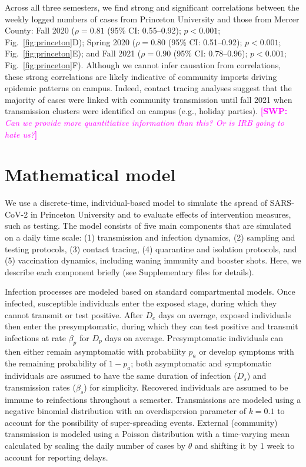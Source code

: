 \documentclass[12pt]{article}
\newcommand{\fref}[1]{Fig.~\ref{fig:#1}}
\newcommand{\comment}[3]{\textcolor{#1}{\textbf{[#2: }\textsl{#3}\textbf{]}}}
\newcommand{\swp}[1]{\comment{magenta}{SWP}{#1}}
\begin{document}
Across all three semesters, we find strong and significant correlations between the weekly logged numbers of cases from Princeton University and those from Mercer County:
Fall 2020 ($\rho = 0.81$  (95\% CI: 0.55--0.92); $p < 0.001$; \fref{princeton}D); Spring 2020 ($\rho = 0.80$  (95\% CI: 0.51--0.92); $p < 0.001$; \fref{princeton}E); and Fall 2021 ($\rho = 0.90$  (95\% CI: 0.78--0.96); $p < 0.001$; \fref{princeton}F). 
Although we cannot infer causation from correlations, these strong correlations are likely indicative of community imports driving epidemic patterns on campus.
Indeed, contact tracing analyses suggest that the majority of cases were linked with community transmission until fall 2021 when transmission clusters were identified on campus (e.g., holiday parties). \swp{Can we provide more quantitiative information than this? Or is IRB going to hate us?}

\section*{Mathematical model}

We use a discrete-time, individual-based model to simulate the spread of SARS-CoV-2 in Princeton University and to evaluate effects of intervention measures, such as testing.
The model consists of five main components that are simulated on a daily time scale: (1) transmission and infection dynamics, (2) sampling and testing protocols, (3) contact tracing, (4) quarantine and isolation protocols, and (5) vaccination dynamics, including waning immunity and booster shots.
Here, we describe each component briefly (see Supplementary files for details).

Infection processes are modeled based on standard compartmental models.
Once infected, susceptible individuals enter the exposed stage, during which they cannot transmit or test positive. 
After $D_e$ days on average, exposed individuals then enter the presymptomatic, during which they can test positive and transmit infections at rate $\beta_p$ for $D_p$ days on average.
Presymptomatic individuals can then either remain asymptomatic with probability $p_a$ or develop symptoms with the remaining probability of $1-p_a$; both asymptomatic and symptomatic individuals are assumed to have the same duration of infection ($D_s$) and transmission rates ($\beta_s$) for simplicity.
Recovered individuals are assumed to be immune to reinfections throughout a semester.
Transmissions are modeled using a negative binomial distribution with an overdispersion parameter of $k=0.1$ to account for the possibility of super-spreading events.
External (community) transmission is modeled using a Poisson distribution with a time-varying mean calculated by scaling the daily number of cases by $\theta$ and shifting it by 1 week to account for reporting delays.
\end{document}
